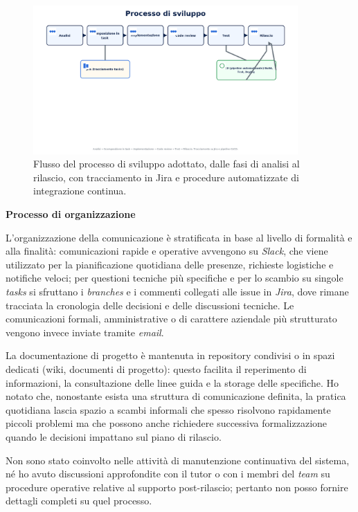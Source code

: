 \begin{figure}[htbp]
    \centering
    \includegraphics[width=0.9\textwidth]{images/azienda/processo_sviluppo}
    \caption{Flusso del processo di sviluppo adottato, dalle fasi di analisi al rilascio, con tracciamento in Jira e procedure automatizzate di integrazione continua.}
    \label{fig:processo_sviluppo}
\end{figure}


\medskip
\noindent\textbf{Processo di organizzazione}

L’organizzazione della comunicazione è stratificata in base al livello di formalità e alla finalità: 
comunicazioni rapide e operative avvengono su \emph{Slack}, che viene utilizzato per la pianificazione quotidiana delle presenze, richieste logistiche e notifiche veloci; 
per questioni tecniche più specifiche e per lo scambio su singole \emph{tasks} si sfruttano i \emph{branches} e i commenti collegati alle issue in \emph{Jira}, 
dove rimane tracciata la cronologia delle decisioni e delle discussioni tecniche. Le comunicazioni formali, amministrative o di carattere aziendale più strutturato vengono invece inviate tramite \emph{email}.

La documentazione di progetto è mantenuta in repository condivisi o in spazi dedicati (wiki, documenti di progetto): 
questo facilita il reperimento di informazioni, la consultazione delle linee guida e la storage delle specifiche. 
Ho notato che, nonostante esista una struttura di comunicazione definita, la pratica quotidiana lascia spazio a scambi informali che spesso risolvono rapidamente piccoli 
problemi ma che possono anche richiedere successiva formalizzazione quando le decisioni impattano sul piano di rilascio.

Non sono stato coinvolto nelle attività di manutenzione continuativa del sistema, né ho avuto discussioni approfondite con il tutor o con i membri del \emph{team} su procedure 
operative relative al supporto post-rilascio; pertanto non posso fornire dettagli completi su quel processo.



